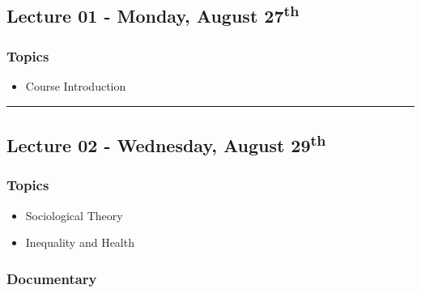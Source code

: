 \documentclass[]{book}
\providecommand{\tightlist}{%
  \setlength{\itemsep}{0pt}\setlength{\parskip}{0pt}}
\theoremstyle{definition}
\theoremstyle{definition}
\theoremstyle{definition}
\theoremstyle{remark}
\begin{document}
\hypertarget{lecture-01---monday-august-27th}{%
\subsection*{\texorpdfstring{Lecture 01 - Monday, August
27\textsuperscript{th}}{Lecture 01 - Monday, August 27th}}\label{lecture-01---monday-august-27th}}

\hypertarget{topics}{%
\subsubsection*{Topics}\label{topics}}

\begin{itemize}
\tightlist
\item
  Course Introduction
\end{itemize}

\begin{center}\rule{0.5\linewidth}{\linethickness}\end{center}

\hypertarget{lecture-02---wednesday-august-29th}{%
\subsection*{\texorpdfstring{Lecture 02 - Wednesday, August
29\textsuperscript{th}}{Lecture 02 - Wednesday, August 29th}}\label{lecture-02---wednesday-august-29th}}

\hypertarget{topics-1}{%
\subsubsection*{Topics}\label{topics-1}}

\begin{itemize}
\tightlist
\item
  Sociological Theory
\item
  Inequality and Health
\end{itemize}

\hypertarget{documentary}{%
\subsubsection*{Documentary}\label{documentary}}
\end{document}
